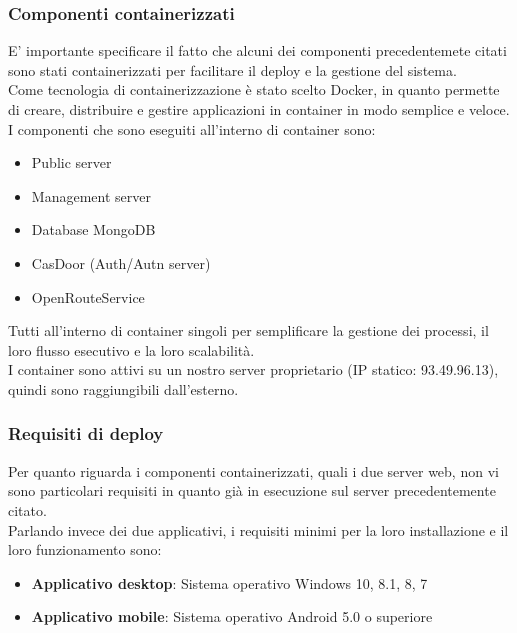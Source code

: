 \documentclass{article}
\begin{document}
\subsubsection{Componenti containerizzati}
E' importante specificare il fatto che alcuni dei componenti precedentemete citati sono stati containerizzati per facilitare il deploy e la gestione del sistema.\\
Come tecnologia di containerizzazione è stato scelto Docker, in quanto permette di creare, distribuire e gestire applicazioni in container in modo semplice e veloce.\\
I componenti che sono eseguiti all'interno di container sono:
\begin{itemize}
    \item Public server
    \item Management server
    \item Database MongoDB
    \item CasDoor (Auth/Autn server)
    \item OpenRouteService
\end{itemize}
Tutti all'interno di container singoli per semplificare la gestione dei processi, il loro flusso esecutivo e la loro scalabilità.\\
I container sono attivi su un nostro server proprietario (IP statico: 93.49.96.13), quindi sono raggiungibili dall'esterno.

\subsubsection{Requisiti di deploy}
Per quanto riguarda i componenti containerizzati, quali i due server web, non vi sono particolari requisiti in quanto già in esecuzione sul server precedentemente citato.\\
Parlando invece dei due applicativi, i requisiti minimi per la loro installazione e il loro funzionamento sono:
\begin{itemize}
    \item \textbf{Applicativo desktop}: Sistema operativo Windows 10, 8.1, 8, 7 %
    \item \textbf{Applicativo mobile}: Sistema operativo Android 5.0 o superiore
\end{itemize}
\end{document}

